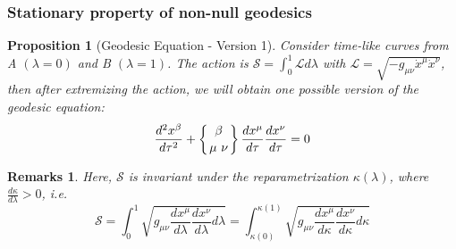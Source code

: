 \documentclass[a4paper]{article}
\newtheorem{remarks}{Remarks}[section]
\theoremstyle{new}
\newtheorem{prop}{Proposition}[section]
\begin{document}
\subsubsection*{Stationary property of non-null geodesics}
\begin{prop}[Geodesic Equation - Version 1]
Consider time-like curves from  A $(\lambda=0)$ and B $(\lambda=1)$. The action is $\mathcal{S}=\int_0^1\mathcal{L}d\lambda$ with $\mathcal{L}=\sqrt{-g_{\mu\nu}\dot{x}^\mu\dot{x}^\nu}$, then after extremizing the action, we will obtain one possible version of the geodesic equation:
\begin{equation}
    \frac{d^2x^\beta}{d\tau^2}+\left \{ {\beta \atop \mu\ \nu}\right \}\frac{dx^\mu}{d\tau}\frac{dx^\nu}{d\tau}=0\label{geodesic1}
\end{equation}
\end{prop}
\begin{remarks}
Here, $\mathcal{S}$ is invariant under the reparametrization $\kappa(\lambda)$, where $\frac{d\kappa}{d\lambda}>0$, i.e. 
$$\mathcal{S}=\int_0^1\sqrt{g_{\mu\nu}\frac{dx^\mu}{d\lambda}\frac{dx^\nu}{d\lambda}d\lambda}=\int_{\kappa(0)}^{\kappa(1)}\sqrt{g_{\mu\nu}\frac{dx^\mu}{d\kappa}\frac{dx^\nu}{d\kappa}d\kappa}$$
\end{remarks}
\end{document}

